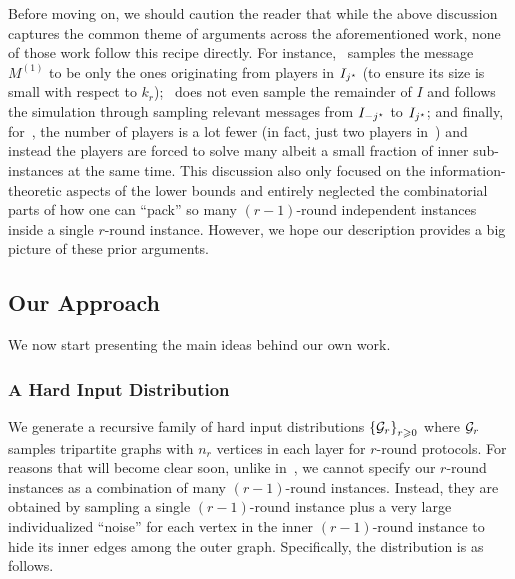 \documentclass[11pt]{article}
\theoremstyle{definition}
\renewcommand{\geq}{\geqslant}
\newcommand{\set}[1]{\ensuremath{\left\{ #1 \right\}}}
\begin{document}
Before moving on, we should caution the reader that while the above discussion captures the common theme of arguments across the aforementioned work, none of those work follow this recipe directly. For instance,~\cite{AlonNRW15} samples
the message $M^{(1)}$ to be only the ones originating from players in $I_{j^{\star}}$ (to ensure its size is small with respect to $k_r$);~\cite{AssadiKZ22} does not even sample the remainder of $I$ and follows
the simulation through sampling relevant messages from $I_{-j^{\star}}$ to $I_{j^{\star}}$; and finally, for~\cite{AssadiKNS24,AssadiBKNS25}, the number of players is a lot fewer (in fact, just two players in~\cite{AssadiBKNS25}) and 
instead the players are forced to solve many albeit a small fraction of inner sub-instances at the same time. This discussion also only focused on the information-theoretic aspects of the lower bounds and entirely 
neglected the combinatorial parts of how one can ``pack'' so many $(r-1)$-round independent instances inside a single $r$-round instance. However, we hope our description provides a big picture of these prior arguments.

\subsection{Our Approach}\label{sec:our-ideas}

We now start presenting the main ideas behind our own work. 

\subsubsection{A Hard Input Distribution}

We generate a recursive family of hard input distributions $\set{\GG_r}_{r \geq 0}$ where $\mathcal{G}_r$ samples tripartite graphs with $n_r$ vertices in each layer for $r$-round protocols. 
For reasons that will become clear soon, unlike in~, we cannot specify our $r$-round instances as a combination of many $(r-1)$-round instances. Instead, they are obtained by sampling a 
single $(r-1)$-round instance plus a very large individualized ``noise'' for each vertex in the inner $(r-1)$-round instance to hide its inner edges among the outer graph. Specifically, the distribution is as follows. 
\end{document}
